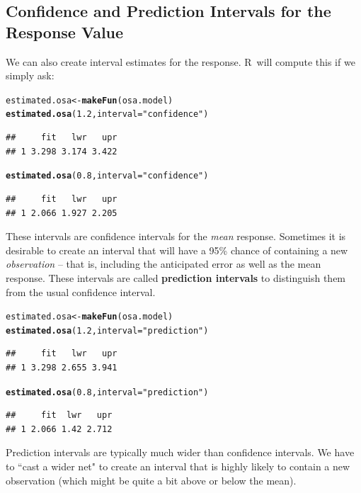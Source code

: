 \documentclass[twoside]{book}\usepackage[]{graphicx}\usepackage[]{xcolor}
\makeatletter
\newcommand{\hlnum}[1]{\textcolor[rgb]{0.686,0.059,0.569}{#1}}%
\newcommand{\hlstr}[1]{\textcolor[rgb]{0.192,0.494,0.8}{#1}}%
\newcommand{\hlstd}[1]{\textcolor[rgb]{0.345,0.345,0.345}{#1}}%
\newcommand{\hlkwb}[1]{\textcolor[rgb]{0.69,0.353,0.396}{#1}}%
\newcommand{\hlkwc}[1]{\textcolor[rgb]{0.333,0.667,0.333}{#1}}%
\newcommand{\hlkwd}[1]{\textcolor[rgb]{0.737,0.353,0.396}{\textbf{#1}}}%
\newenvironment{kframe}{%
 \def\at@end@of@kframe{}%
 \ifinner\ifhmode%
  \def\at@end@of@kframe{\end{minipage}}%
  \begin{minipage}{\columnwidth}%
 \fi\fi%
 \def\FrameCommand##1{\hskip\@totalleftmargin \hskip-\fboxsep
 \colorbox{shadecolor}{##1}\hskip-\fboxsep
     \hskip-\linewidth \hskip-\@totalleftmargin \hskip\columnwidth}%
 \MakeFramed {\advance\hsize-\width
   \@totalleftmargin\z@ \linewidth\hsize
   \@setminipage}}%
 {\par\unskip\endMakeFramed%
 \at@end@of@kframe}
\newenvironment{knitrout}{}{} %
\def\R{{\sf R}}
\def\term#1{\textbf{#1}}
\makeatother
\begin{document}
\subsection{Confidence and Prediction Intervals for the Response Value}
We can also create interval estimates for the response.    \R\ will compute
this if we simply ask:
\begin{knitrout}
\color{fgcolor}\begin{kframe}
\begin{alltt}
\hlstd{estimated.osa} \hlkwb{<-} \hlkwd{makeFun}\hlstd{(osa.model)}
\hlkwd{estimated.osa}\hlstd{(}\hlnum{1.2}\hlstd{,} \hlkwc{interval} \hlstd{=} \hlstr{"confidence"}\hlstd{)}
\end{alltt}
\begin{verbatim}
##     fit   lwr   upr
## 1 3.298 3.174 3.422
\end{verbatim}
\begin{alltt}
\hlkwd{estimated.osa}\hlstd{(}\hlnum{0.8}\hlstd{,} \hlkwc{interval} \hlstd{=} \hlstr{"confidence"}\hlstd{)}
\end{alltt}
\begin{verbatim}
##     fit   lwr   upr
## 1 2.066 1.927 2.205
\end{verbatim}
\end{kframe}
\end{knitrout}
These intervals are confidence intervals for the \emph{mean} response.  Sometimes it
is desirable to create an interval that will have a 95\% chance of containing a new 
\emph{observation} -- that is, including the anticipated error as well as the mean response.  These intervals are called \term{prediction intervals} to distinguish
them from the usual confidence interval.
\begin{knitrout}
\color{fgcolor}\begin{kframe}
\begin{alltt}
\hlstd{estimated.osa} \hlkwb{<-} \hlkwd{makeFun}\hlstd{(osa.model)}
\hlkwd{estimated.osa}\hlstd{(}\hlnum{1.2}\hlstd{,} \hlkwc{interval} \hlstd{=} \hlstr{"prediction"}\hlstd{)}
\end{alltt}
\begin{verbatim}
##     fit   lwr   upr
## 1 3.298 2.655 3.941
\end{verbatim}
\begin{alltt}
\hlkwd{estimated.osa}\hlstd{(}\hlnum{0.8}\hlstd{,} \hlkwc{interval} \hlstd{=} \hlstr{"prediction"}\hlstd{)}
\end{alltt}
\begin{verbatim}
##     fit  lwr   upr
## 1 2.066 1.42 2.712
\end{verbatim}
\end{kframe}
\end{knitrout}
Prediction intervals are typically much wider than confidence intervals.  
We have to ``cast a wider net"  to create an interval that is highly likely to contain a new 
observation (which might be quite a bit above or below the mean).
\end{document}
